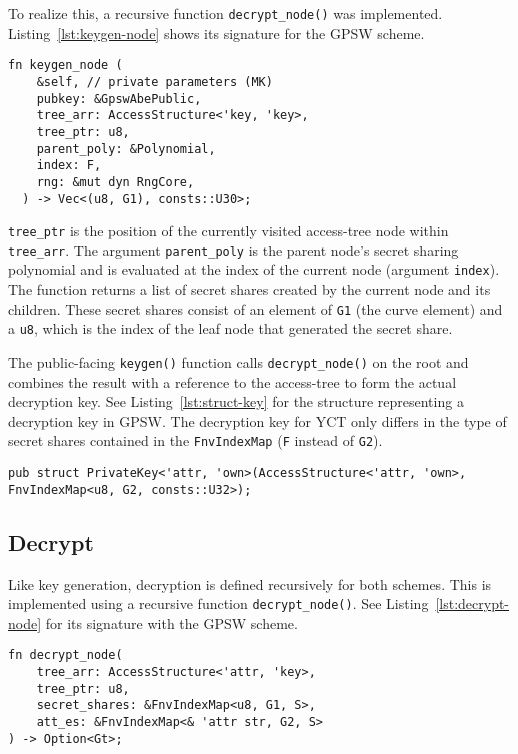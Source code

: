 To realize this, a recursive function \verb+decrypt_node()+ was implemented.
Listing~\ref{lst:keygen-node} shows its signature for the GPSW scheme. 

\begin{lstlisting}[caption={Function signature of recursive key generation},label={lst:keygen-node}]
fn keygen_node (
    &self, // private parameters (MK)
    pubkey: &GpswAbePublic,
    tree_arr: AccessStructure<'key, 'key>,
    tree_ptr: u8,
    parent_poly: &Polynomial,
    index: F,
    rng: &mut dyn RngCore,
  ) -> Vec<(u8, G1), consts::U30>;
\end{lstlisting}

\verb+tree_ptr+ is the position of the currently visited \gls{access-tree} node within \verb+tree_arr+.
The argument \verb+parent_poly+ is the parent node's secret sharing polynomial and is evaluated at the index of the current node (argument \texttt{index}).
The function returns a list of secret shares created by the current node and its children. 
These secret shares consist of an element of \texttt{G1} (the curve element) and a \texttt{u8}, which is the index of the leaf node that generated the secret share.

The public-facing \verb+keygen()+ function calls \verb+decrypt_node()+ on the root and combines the result with a reference to the \gls{access-tree} to form the actual decryption key.
See Listing~\ref{lst:struct-key} for the structure representing a decryption key in GPSW.
The decryption key for YCT only differs in the type of secret shares contained in the \texttt{FnvIndexMap} (\texttt{F} instead of \texttt{G2}).

\begin{lstlisting}[caption={Decryption key struct},label={lst:struct-key}, breaklines=true]
pub struct PrivateKey<'attr, 'own>(AccessStructure<'attr, 'own>, FnvIndexMap<u8, G2, consts::U32>);
\end{lstlisting}

\subsection{Decrypt}
Like key generation, decryption is defined recursively for both schemes.
This is implemented using a recursive function \verb+decrypt_node()+.
See Listing~\ref{lst:decrypt-node} for its signature with the GPSW scheme.

\begin{lstlisting}[caption={Function signature of recursive decryption},label={lst:decrypt-node}]
fn decrypt_node(
    tree_arr: AccessStructure<'attr, 'key>,
    tree_ptr: u8,
    secret_shares: &FnvIndexMap<u8, G1, S>,
    att_es: &FnvIndexMap<& 'attr str, G2, S>
) -> Option<Gt>;
\end{lstlisting}

